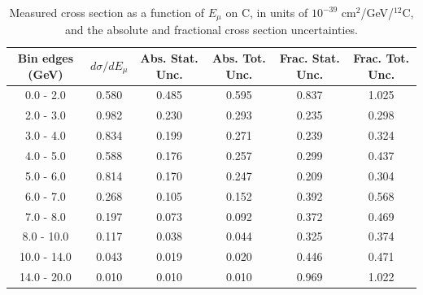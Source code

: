 \documentclass[aps,prl,twocolumn,superscriptaddress,nofootinbib]{revtex4-1}
\begin{document}
\begin{table}[h!]
  \centering
  \caption{Measured cross section as a function of $E_{\mu}$ on C, in units of
  $10^{-39}$ $\text{cm}^{2}$/GeV/$^{12}$C, and the absolute and
  fractional cross section uncertainties.}
    \begin{tabular}{c||c||c|c||c|c}
      Bin edges (GeV)  &  $d\sigma/dE_{\mu}$  &  Abs. Stat. Unc. & Abs. Tot. Unc.  &  Frac. Stat. Unc.  &  Frac. Tot. Unc. \\
      \hline\hline
        0.0 - 2.0 & 0.580 & 0.485 & 0.595 & 0.837 & 1.025 \\
        2.0 - 3.0 & 0.982 & 0.230 & 0.293 & 0.235 & 0.298 \\
        3.0 - 4.0 & 0.834 & 0.199 & 0.271 & 0.239 & 0.324 \\
        4.0 - 5.0 & 0.588 & 0.176 & 0.257 & 0.299 & 0.437 \\
        5.0 - 6.0 & 0.814 & 0.170 & 0.247 & 0.209 & 0.304 \\
        6.0 - 7.0 & 0.268 & 0.105 & 0.152 & 0.392 & 0.568 \\
        7.0 - 8.0 & 0.197 & 0.073 & 0.092 & 0.372 & 0.469 \\
       8.0 - 10.0 & 0.117 & 0.038 & 0.044 & 0.325 & 0.374 \\
      10.0 - 14.0 & 0.043 & 0.019 & 0.020 & 0.446 & 0.471 \\
      14.0 - 20.0 & 0.010 & 0.010 & 0.010 & 0.969 & 1.022 \\
    \end{tabular}
  \label{table:EmuXSec_C}
\end{table}
\end{document}

